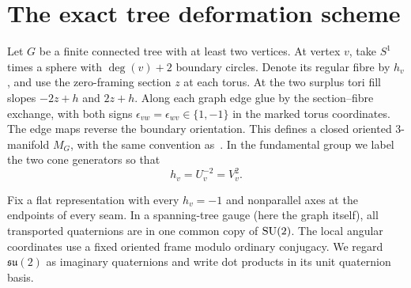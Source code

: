 \section{The exact tree deformation scheme}\label{sec:flat}

Let \(G\) be a finite connected tree with at least two vertices. At vertex \(v\), take \(S^1\) times a sphere with \(\deg(v)+2\) boundary circles. Denote its regular fibre by \(h_v\), and use the zero-framing section \(z\) at each torus. At the two surplus tori fill slopes \(-2z+h\) and \(2z+h\). Along each graph edge glue by the section--fibre exchange, with both signs \(\epsilon_{vw}=\epsilon_{wv}\in\{1,-1\}\) in the marked torus coordinates. The edge maps reverse the boundary orientation. This defines a closed oriented 3-manifold \(M_G\), with the same convention as~\cite{Paper48,Paper49}. In the fundamental group we label the two cone generators so that
\[
        h_v=U_v^{-2}=V_v^{2}.
\]

Fix a flat representation with every \(h_v=-1\) and nonparallel axes at the endpoints of every seam. In a spanning-tree gauge (here the graph itself), all transported quaternions are in one common copy of \(\mathrm{SU}(2)\). The local angular coordinates use a fixed oriented frame modulo ordinary conjugacy. We regard \(\mathfrak{su}(2)\) as imaginary quaternions and write dot products in its unit quaternion basis.

